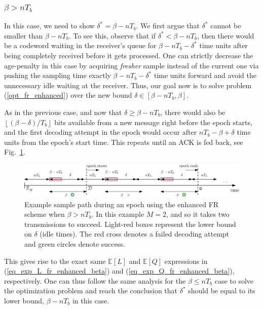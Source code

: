 \documentclass[12pt,journal,onecolumn]{IEEEtran}
\begin{document}
\subsubsection{$\beta>nT_b$}

In this case, we need to show $\delta^*=\beta-nT_b$. We first argue that $\delta^*$ cannot be smaller than $\beta-nT_b$. To see this, observe that if $\delta^*<\beta-nT_b$, then there would be a codeword waiting in the receiver's queue for $\beta-nT_b-\delta^*$ time units after being completely received before it gets processed. One can strictly decrease the age-penalty in this case by acquiring {\it fresher} sample instead of the current one via pushing the sampling time exactly $\beta-nT_b-\delta^*$ time units forward and avoid the unnecessary idle waiting at the receiver. Thus, our goal now is to solve problem (\ref{opt_fr_enhanced}) over the new bound $\delta\in\left[\beta-nT_b,\beta\right]$.

As in the previous case, and now that $\delta\geq\beta-nT_b$, there would also be $\left\lfloor(\beta-\delta)/T_b\right\rfloor$ bits available from a new message right before the epoch starts, and the first decoding attempt in the epoch would occur after $nT_b-\beta+\delta$ time units from the epoch's start time. This repeats until an ACK is fed back, see Fig.~\ref{fig_fr_enhanced_Tb}.

\begin{figure}
\center
\includegraphics[scale=.5]{fr_enhanced_Tb}
\caption{Example sample path during an epoch using the enhanced FR scheme when $\beta>nT_b$. In this example $M=2$, and so it takes two transmissions to succeed. Light-red boxes represent the lower bound on $\delta$ (idle times). The red cross denotes a failed decoding attempt and green circles denote success.}
\label{fig_fr_enhanced_Tb}
\end{figure}

This gives rise to the exact same $\mathbb{E}[L]$ and $\mathbb{E}[Q]$ expressions in (\ref{eq_exp_L_fr_enhanced_beta}) and (\ref{eq_exp_Q_fr_enhanced_beta}), respectively. One can thus follow the same analysis for the $\beta\leq nT_b$ case to solve the optimization problem and reach the conclusion that $\delta^*$ should be equal to its lower bound, $\beta-nT_b$ in this case.
\end{document}
